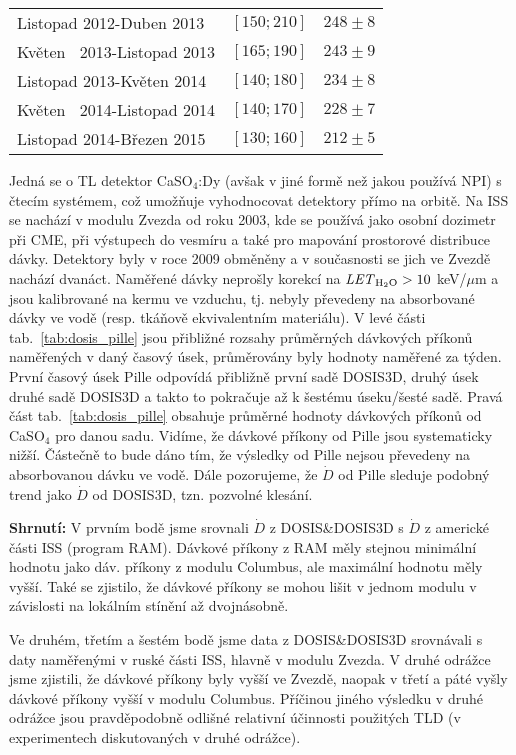 \begin{enumerate}
\begin{table}[ht]
\begin{tabular}{l|l||l}
		Listopad 2012-Duben  2013&$[150;210]$&$248\pm8$	\\
		Květen $\ $ 2013-Listopad 2013&$[165;190]$&$243\pm9$	\\
		Listopad 2013-Květen  2014&$[140;180]$&$234\pm8$	\\
		Květen $\ $ 2014-Listopad 2014&$[140;170]$&$228\pm7$	\\
		Listopad 2014-Březen  2015&$[130;160]$&$212\pm5$	\\
		\bottomrule
	  \end{tabular}
	\end{table}
	 Jedná se o TL detektor CaSO$_4$:Dy (avšak v jiné formě než jakou používá NPI) s čtecím systémem, což umožňuje vyhodnocovat detektory přímo na orbitě. Na ISS se nachází v modulu Zvezda od roku 2003, kde se používá jako osobní dozimetr při CME, při výstupech do vesmíru a také pro mapování prostorové distribuce dávky. Detektory byly v roce 2009 obměněny a v současnosti se jich ve Zvezdě nachází dvanáct. Naměřené dávky neprošly korekcí na $\mathit{LET}_{\text{H$_2$O}}>10$ keV/$\mu$m a jsou kalibrované na kermu ve vzduchu, tj. nebyly převedeny na absorbované dávky ve vodě (resp. tkáňově ekvivalentním materiálu). V levé části tab.~\ref{tab:dosis_pille} jsou přibližné rozsahy průměrných dávkových příkonů naměřených v daný časový úsek, průměrovány byly hodnoty
	 naměřené za týden. První časový úsek Pille odpovídá přibližně první sadě DOSIS3D, druhý úsek druhé sadě DOSIS3D a takto to pokračuje až k šestému úseku/šesté sadě. Pravá část tab.~\ref{tab:dosis_pille} obsahuje průměrné hodnoty dávkových příkonů od CaSO$_4$ pro danou sadu. Vidíme, že dávkové příkony od Pille jsou systematicky nižší. Částečně to bude dáno tím, že výsledky od Pille nejsou převedeny na absorbovanou dávku ve vodě. Dále pozorujeme, že $\dot{D}$ od Pille sleduje podobný trend jako
	 $\dot{D}$ od DOSIS3D, tzn. pozvolné klesání.~\cite{pille, pille2}
 \end{enumerate}
 \textbf{Shrnutí:} V prvním bodě jsme srovnali $\dot{D}$ z DOSIS\&DOSIS3D s $\dot{D}$ z americké části ISS (program RAM). Dávkové příkony z RAM měly stejnou minimální hodnotu jako dáv. příkony z modulu Columbus, ale maximální hodnotu měly vyšší. Také se zjistilo, že dávkové příkony se mohou lišit v jednom modulu v závislosti na lokálním stínění až dvojnásobně.
 
 Ve druhém, třetím a šestém bodě jsme data z DOSIS\&DOSIS3D srovnávali s daty naměřenými v ruské části ISS, hlavně v modulu Zvezda. V druhé odrážce jsme zjistili, že dávkové příkony byly vyšší ve Zvezdě, naopak v třetí a páté vyšly dávkové příkony vyšší v modulu Columbus. Příčinou jiného výsledku v druhé odrážce jsou pravděpodobně odlišné relativní účinnosti použitých TLD (v experimentech diskutovaných v druhé odrážce).

